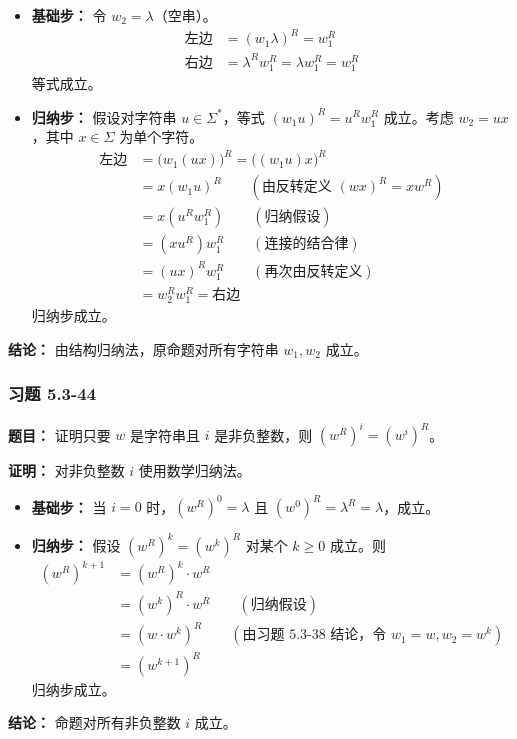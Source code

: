 \documentclass[11pt,UTF8]{article}
\begin{document}
\begin{itemize}
    \item \textbf{基础步：} 令 $w_2 = \lambda$（空串）。
    \begin{align*}
        \text{左边} &= (w_1 \lambda)^R = w_1^R \\
        \text{右边} &= \lambda^R w_1^R = \lambda w_1^R = w_1^R
    \end{align*}
    等式成立。

    \item \textbf{归纳步：} 假设对字符串 $u \in \Sigma^*$，等式 $(w_1 u)^R = u^R w_1^R$ 成立。考虑 $w_2 = ux$，其中 $x \in \Sigma$ 为单个字符。
    \begin{align*}
        \text{左边} &= \bigl(w_1 (ux)\bigr)^R = \bigl((w_1 u)x\bigr)^R \\
        &= x (w_1 u)^R \qquad (\text{由反转定义 } (wx)^R = x w^R) \\
        &= x (u^R w_1^R) \qquad (\text{归纳假设}) \\
        &= (x u^R) w_1^R \qquad (\text{连接的结合律}) \\
        &= (ux)^R w_1^R \qquad (\text{再次由反转定义}) \\
        &= w_2^R w_1^R = \text{右边}
    \end{align*}
    归纳步成立。
\end{itemize}
\textbf{结论：} 由结构归纳法，原命题对所有字符串 $w_1, w_2$ 成立。

\subsubsection*{习题 5.3-44}
\textbf{题目：} 证明只要 $w$ 是字符串且 $i$ 是非负整数，则 $(w^R)^i = (w^i)^R$。

\textbf{证明：} 对非负整数 $i$ 使用数学归纳法。

\begin{itemize}
    \item \textbf{基础步：} 当 $i=0$ 时，$(w^R)^0 = \lambda$ 且 $(w^0)^R = \lambda^R = \lambda$，成立。

    \item \textbf{归纳步：} 假设 $(w^R)^k = (w^k)^R$ 对某个 $k \ge 0$ 成立。则
    \begin{align*}
        (w^R)^{k+1} &= (w^R)^k \cdot w^R \\
        &= (w^k)^R \cdot w^R \qquad (\text{归纳假设}) \\
        &= (w \cdot w^k)^R \qquad (\text{由习题 5.3-38 结论，令 } w_1=w, w_2=w^k) \\
        &= (w^{k+1})^R
    \end{align*}
    归纳步成立。
\end{itemize}
\textbf{结论：} 命题对所有非负整数 $i$ 成立。
\end{document}
